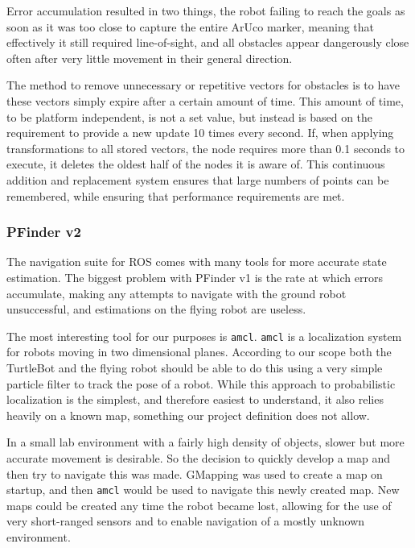\documentclass{article}[12]
\begin{document}
 	Error accumulation resulted in two things, the robot failing to reach the goals as soon as it was too close to capture the entire ArUco marker, meaning that effectively it still required line-of-sight, and all obstacles appear dangerously close often after very little movement in their general direction. 


	The method to remove unnecessary or repetitive vectors for obstacles is to have these vectors simply expire after a certain amount of time. This amount of time, to be platform independent, is not a set value, but instead is based on the requirement to provide a new update 10 times every second. If, when applying transformations to all stored vectors, the node requires more than 0.1 seconds to execute, it deletes the oldest half of the nodes it is aware of. This continuous addition and replacement system ensures that large numbers of points can be remembered, while ensuring that performance requirements are met.
	
	\subsubsection{PFinder v2}
	
	The navigation suite for ROS comes with many tools for more accurate state estimation. The biggest problem with PFinder v1 is the rate at which errors accumulate, making any attempts to navigate with the ground robot unsuccessful, and estimations on the flying robot are useless.
	
	The most interesting tool for our purposes is \texttt{amcl}. \texttt{amcl} is a localization system for robots moving in two dimensional planes. According to our scope both the TurtleBot and the flying robot should be able to do this using a very simple particle filter to track the pose of a robot. While this approach to probabilistic localization is the simplest, and therefore easiest to understand, it also relies heavily on a known map, something our project definition does not allow.
	
	In a small lab environment with a fairly high density of objects, slower but more accurate movement is desirable. So the decision to quickly develop a map and then try to navigate this was made. GMapping was used to create a map on startup, and then \texttt{amcl} would be used to navigate this newly created map. New maps could be created any time the robot became lost, allowing for the use of very short-ranged sensors and to enable navigation of a mostly unknown environment.
	
\end{document}
